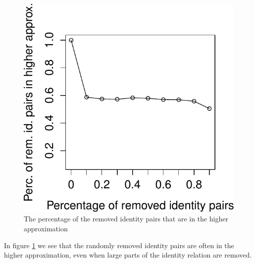 \begin{figure}
\label{fig:in_higher}
\centering
\includegraphics[width=0.8\linewidth]{./img/in_higher}
\caption{
  The percentage of the removed identity pairs that are in the higher approximation
}
\end{figure}

In figure \ref{fig:in_higher}
  we see that the randomly removed identity pairs are often
  in the higher approximation, even when large parts of
  the identity relation are removed.

